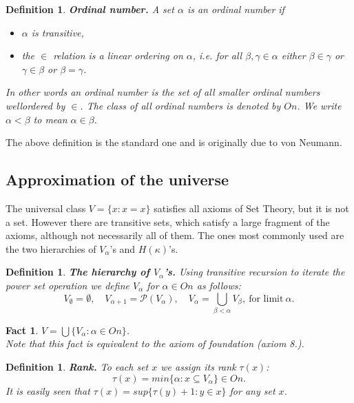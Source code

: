\documentclass[a4paper,11pt,oneside]{mybook}
\def\pw{{{\mathcal P}}}
\theoremstyle{theorem}
\newtheorem{fact}[subsection]{Fact}
\newtheorem{definition}[subsection]{Definition}
\theoremstyle{example}
\begin{document}
{\begin{definition}\label{ordnumber}{\bf Ordinal number.} A set $\alpha$ is an ordinal number if
 \begin{itemize}
  \item[(i)]   $\alpha$ is transitive,
  \item[(ii)] the $\in$ relation is a linear ordering on $\alpha$, i.e. for all $\beta,\gamma\in\alpha$
               either $\beta\in\gamma$ or $\gamma\in\beta$ or $\beta=\gamma$.
 \end{itemize}
 In other words an ordinal number is the set of all smaller ordinal numbers wellordered by $\in$.
 The class of all ordinal numbers is denoted by $On$. We write $\alpha<\beta$ to mean $\alpha\in\beta$.
\end{definition}

The above definition is the standard one and is originally due to von Neumann.

\subsection{Approximation of the universe}

The universal class $V=\{x:x=x\}$ satisfies all axioms of Set Theory, but it is not a set. However there are transitive sets,
which satisfy a large fragment of the axioms, although not necessarily all of them. The ones most commonly used are
the two hierarchies of $V_\alpha$'s and $H(\kappa)$'s.

\begin{definition}{\bf The hierarchy of $V_\alpha$'s.} Using transitive recursion to iterate the power set operation we define $V_\alpha$
for $\alpha\in On$ as follows:
$$ %
V_{\emptyset}=\emptyset,\quad V_{\alpha+1}=\pw(V_\alpha),\quad V_\alpha = \bigcup_{\beta<\alpha} V_\beta,\ \mbox{for limit}\ \alpha.
$$ %
\end{definition}
\begin{fact} $V=\bigcup\{V_\alpha:\alpha\in On\}$. \\
Note that this fact is equivalent to the axiom of foundation (axiom 8.).
\end{fact}

\begin{definition}\label{rank}{\bf Rank.} To each set $x$ we assign its \emph{rank} $\tau(x)$:
 $$ %
  \tau(x)=min\{\alpha:x\subseteq V_\alpha\} \in On.
 $$ %
  It is easily seen that $\tau(x)=sup\{\tau(y)+1:y\in x\}$ for any set $x$.
\end{definition}

}
\end{document}
